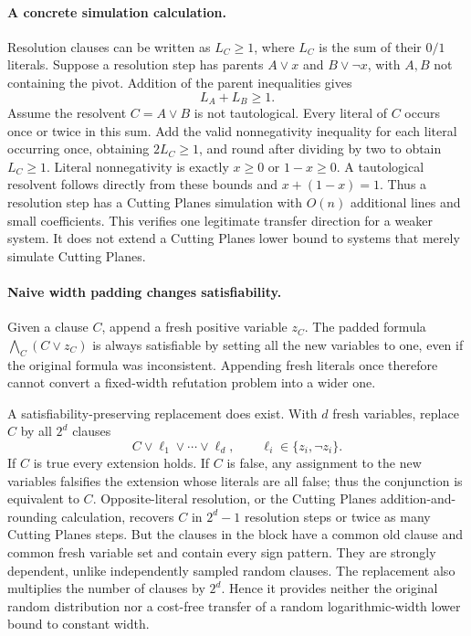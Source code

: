\documentclass[11pt]{article}
\begin{document}
\paragraph{A concrete simulation calculation.}
Resolution clauses can be written as $L_C\ge1$, where $L_C$ is the sum of their $0/1$ literals. Suppose a resolution step has parents $A\lor x$ and $B\lor\neg x$, with $A,B$ not containing the pivot. Addition of the parent inequalities gives
\[
 L_A+L_B\ge1.
\]
Assume the resolvent $C=A\lor B$ is not tautological. Every literal of $C$ occurs once or twice in this sum. Add the valid nonnegativity inequality for each literal occurring once, obtaining $2L_C\ge1$, and round after dividing by two to obtain $L_C\ge1$. Literal nonnegativity is exactly $x\ge0$ or $1-x\ge0$. A tautological resolvent follows directly from these bounds and $x+(1-x)=1$. Thus a resolution step has a Cutting Planes simulation with $O(n)$ additional lines and small coefficients. This verifies one legitimate transfer direction for a weaker system. It does not extend a Cutting Planes lower bound to systems that merely simulate Cutting Planes.

\paragraph{Naive width padding changes satisfiability.}
Given a clause $C$, append a fresh positive variable $z_C$. The padded formula $\bigwedge_C(C\lor z_C)$ is always satisfiable by setting all the new variables to one, even if the original formula was inconsistent. Appending fresh literals once therefore cannot convert a fixed-width refutation problem into a wider one.

A satisfiability-preserving replacement does exist. With $d$ fresh variables, replace $C$ by all $2^d$ clauses
\[
 C\lor\ell_1\lor\cdots\lor\ell_d,
 \qquad \ell_i\in\{z_i,\neg z_i\}.
\]
If $C$ is true every extension holds. If $C$ is false, any assignment to the new variables falsifies the extension whose literals are all false; thus the conjunction is equivalent to $C$. Opposite-literal resolution, or the Cutting Planes addition-and-rounding calculation, recovers $C$ in $2^d-1$ resolution steps or twice as many Cutting Planes steps. But the clauses in the block have a common old clause and common fresh variable set and contain every sign pattern. They are strongly dependent, unlike independently sampled random clauses. The replacement also multiplies the number of clauses by $2^d$. Hence it provides neither the original random distribution nor a cost-free transfer of a random logarithmic-width lower bound to constant width.
\end{document}
